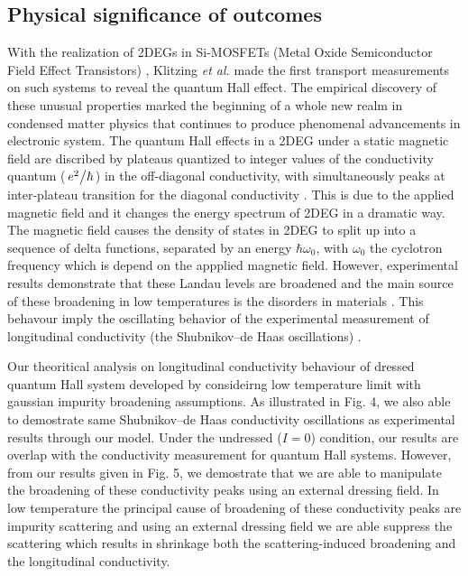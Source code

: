 \documentclass{article}
\begin{document}
{\color{Maroon}
\subsection*{Physical significance of outcomes}

With the realization of 2DEGs in Si-MOSFETs (Metal Oxide Semiconductor Field Effect Transistors) \cite{fowler66}, Klitzing \textit{et al.} \cite{klitzing80} made the first transport measurements on such systems to reveal the quantum Hall effect. The empirical discovery of these unusual properties marked the beginning of a whole new realm in condensed matter physics that continues to produce phenomenal advancements in electronic system. The quantum Hall effects in a 2DEG under a static magnetic field are discribed by plateaus quantized to integer values of the conductivity quantum ($\flatfrac{e^2}{\hbar}$) in the off-diagonal conductivity, with simultaneously peaks at inter-plateau transition for the diagonal conductivity \cite{endo09}. This is due to the applied magnetic field and it changes the energy spectrum of 2DEG in a dramatic way. The magnetic field causes the density of states in 2DEG to split up into a sequence of delta functions, separated by an energy $\hbar\omega_0$, with $\omega_0$ the cyclotron frequency which is depend on the appplied magnetic field.
However, experimental results demonstrate that these Landau levels are broadened and the main source of these broadening  in low temperatures is the disorders in materials \cite{ando85,dial07}. This behavour imply the  oscillating behavior of the experimental measurement of longitudinal conductivity (the Shubnikov–de Haas oscillations) \cite{endo09,wakabayashi78}.

Our theoritical analysis on longitudinal conductivity behaviour of dressed quantum Hall system developed by consideirng low temperature limit with gaussian impurity broadening assumptions. As illustrated in Fig. 4, we also able to demostrate same Shubnikov–de Haas conductivity oscillations as experimental results \cite{endo09,wakabayashi78} through our model. Under the undressed ($I=0$) condition, our results are overlap with the conductivity measurement for quantum Hall systems. However, from our results given in Fig. 5, we demostrate that we are able to manipulate the broadening of these conductivity peaks using an external dressing field. In low temperature the principal cause of broadening of these conductivity peaks are impurity scattering and using an external dressing field we are able suppress the scattering which results in shrinkage both the scattering-induced broadening and the longitudinal conductivity.

}
\end{document}
